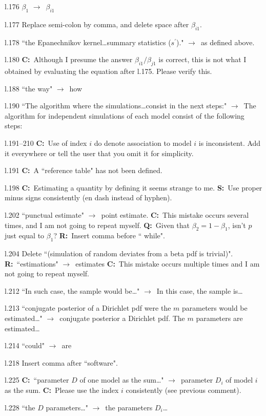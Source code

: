 \documentclass[11pt]{article}
\newenvironment{my_description}
{\begin{description}
  \setlength{\itemsep}{2pt}
  \setlength{\parskip}{0pt}
  \setlength{\parsep}{0pt}}
{\end{description}}
\newcommand{\ra}{$\rightarrow$\ }
\newcommand{\C}{\textbf{C:}\ }
\newcommand{\Q}{\textbf{Q:}\ }
\newcommand{\R}{\textbf{R:}\ }
\newcommand{\V}{\textbf{S:}\ }
\begin{document}
\begin{my_description}
	\item[l.176] $\beta_1$ \ra $\beta_{i1}$
	\item[l.177] Replace semi-colon by comma, and delete space after $\beta_{i1}$.
	\item[l.178] ``the Epanechnikov kernel\dots summary statistics ($s^{\prime}$)." \ra as defined above.
	\item[l.180] \C Although I presume the answer $\beta_{i1}/\beta_{j1}$ is correct, this is not what I obtained by evaluating the equation after l.175. Please verify this.
	\item[l.188] ``the way" \ra how
	\item[l.190] ``The algorithm where the simulations\dots consist in the next steps:" \ra The algorithm for independent simulations of each model consist of the following steps:
	\item[l.191--210] \C Use of index $i$ do denote association to model $i$ is inconsistent. Add it everywhere or tell the user that you omit it for simplicity.
	\item[l.191] \C A ``reference table" has not been defined.
	\item[l.198] \C Estimating a quantity by defining it seems strange to me. \V Use proper minus signs consistently (en dash instead of hyphen).
	\item[l.202] ``punctual estimate" \ra point estimate. \C This mistake occurs several times, and I am not going to repeat myself. \Q Given that $\beta_{2} = 1 - \beta_{1}$, isn't $p$ just equal to $\beta_1$? \R Insert comma before `` while".
	\item[l.204] Delete ``(simulation of random deviates from a beta pdf is trivial)". \R ``estimations" \ra estimates \C This mistake occurs multiple times and I am not going to repeat myself.
	\item[l.212] ``In such case, the sample would be\dots" \ra In this case, the sample is\dots
	\item[l.213] ``conjugate posterior of a Dirichlet pdf were the $m$ parameters would be estimated\dots" \ra conjugate posterior a Dirichlet pdf. The $m$ parameters are estimated\dots
	\item[l.214] ``could" \ra are
	\item[l.218] Insert comma after ``software".
	\item[l.225] \C ``parameter $D$ of one model as the sum\dots" \ra parameter $D_i$ of model $i$ as the sum. \C Please use the index $i$ consistently (see previous comment).
	\item[l.228] ``the $D$ parameters\dots" \ra the parameters $D_i$\dots

\end{my_description}
\end{document}
